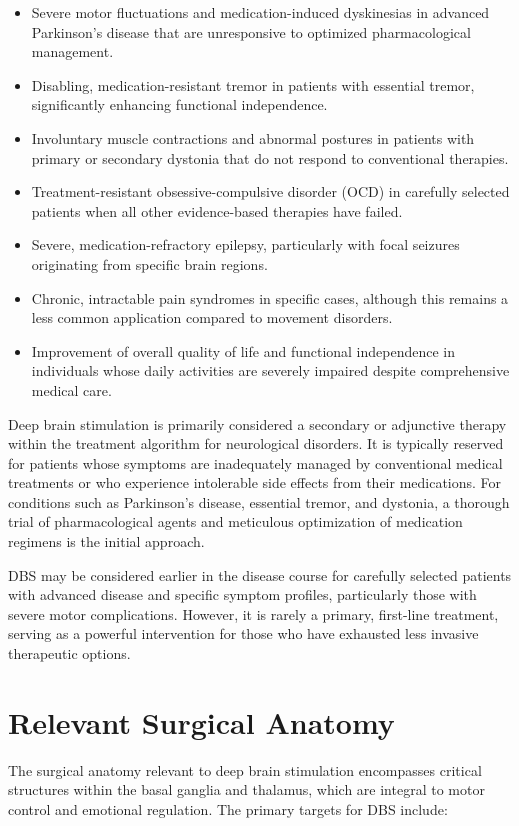 \begin{itemize}
  \item Severe motor fluctuations and medication-induced dyskinesias in advanced Parkinson's disease that are unresponsive to optimized pharmacological management.
  \item Disabling, medication-resistant tremor in patients with essential tremor, significantly enhancing functional independence.
  \item Involuntary muscle contractions and abnormal postures in patients with primary or secondary dystonia that do not respond to conventional therapies.
  \item Treatment-resistant obsessive-compulsive disorder (OCD) in carefully selected patients when all other evidence-based therapies have failed.
  \item Severe, medication-refractory epilepsy, particularly with focal seizures originating from specific brain regions.
  \item Chronic, intractable pain syndromes in specific cases, although this remains a less common application compared to movement disorders.
  \item Improvement of overall quality of life and functional independence in individuals whose daily activities are severely impaired despite comprehensive medical care.
\end{itemize}

Deep brain stimulation is primarily considered a secondary or adjunctive therapy within the treatment algorithm for neurological disorders. It is typically reserved for patients whose symptoms are inadequately managed by conventional medical treatments or who experience intolerable side effects from their medications. For conditions such as Parkinson's disease, essential tremor, and dystonia, a thorough trial of pharmacological agents and meticulous optimization of medication regimens is the initial approach. 

DBS may be considered earlier in the disease course for carefully selected patients with advanced disease and specific symptom profiles, particularly those with severe motor complications. However, it is rarely a primary, first-line treatment, serving as a powerful intervention for those who have exhausted less invasive therapeutic options.

\section*{Relevant Surgical Anatomy}
The surgical anatomy relevant to deep brain stimulation encompasses critical structures within the basal ganglia and thalamus, which are integral to motor control and emotional regulation. The primary targets for DBS include:

